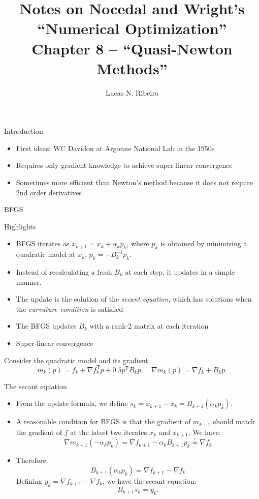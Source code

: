 \documentclass{beamer}
\title[Chapter 7]{Notes on Nocedal and Wright's ``Numerical Optimization''\\Chapter 8 --  ``Quasi-Newton Methods''}
\author{Lucas N. Ribeiro}
\date{}
\newcommand{\tran}{\mathsf{T}}
\begin{document}
 
\frame{\titlepage}
 
\begin{frame}[allowframebreaks]{Introduction}
	\begin{itemize}
		\item First ideas: WC Davidon at Argonne National Lab in the 1950s
		\item Requires only gradient knowledge to achieve super-linear convergence
		\item Sometimes more efficient than Newton's method because it does not require 2nd order derivatives
	\end{itemize}
\end{frame}

\begin{frame}[allowframebreaks]{BFGS}

	\begin{block}{Highlights}
		\begin{itemize}
			\item BFGS iterates as $x_{k+1} = x_k + \alpha_k p_k$, where $p_k$ is obtained by minimizing a quadratic model at $x_k$, $p_k = -B_k^{-1}p_k$.
			\item Instead of recalculating a fresh $B_k$ at each step, it updates in a simple manner.
			\item The update is the solution of the \emph{secant equation}, which has solutions when the \emph{curvature condition} is satisfied
			\item The BFGS updates $B_k$ with a rank-$2$ matrix at each iteration
			\item Super-linear convergence
		\end{itemize}
	\end{block}

	Consider the quadratic model and its gradient
	\[
	m_k(p)= f_k + \nabla f_k^\tran p + 0.5 p^\tran B_k p,\quad \nabla m_k(p) = \nabla f_k + B_k p.
	\]

	\newpage
	\begin{block}{The secant equation}
		\begin{itemize}
			\item From the update formula, we define $s_k = x_{k+1} - x_k = B_{k+1} (\alpha_k p_k)$.
			\item A reasonable condition for BFGS is that the gradient of $m_{k+1}$ should match the gradient of $f$ at the latest two iterates $x_k$ and $x_{k+1}$. We have:
			\[
				\nabla m_{k+1}(-\alpha_k p_k) = \nabla f_{k+1} - \alpha_k B_{k+1} p_k \stackrel{!}{=} \nabla f_k
			\]
			\item Therefore:
			\[
				B_{k+1}(\alpha_k p_k) = \nabla f_{k+1} - \nabla f_k
			\]
			Defining $y_k=\nabla f_{k+1} - \nabla f_k$, we have the secant equation:
			\[
				B_{k+1} s_k = y_k.
			\]
		\end{itemize}
	\end{block}


\end{frame}
\end{document}
